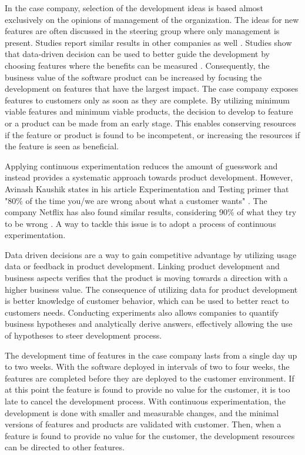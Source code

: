 \documentclass[english]{tktltiki2}
\theoremstyle{definition}
\theoremstyle{remark}
\begin{document}
In the case company, selection of the development ideas is based almost exclusively on the opinions of management of the organization. The ideas for new features are often discussed in the steering group where only management is present. Studies report similar results in other companies as well \cite{kohavi2007practical}. Studies show that data-driven decision can be used to better guide the development by choosing features where the benefits can be measured \cite{kohavi2007practical, moran2007wrong, kaushik}. Consequently, the business value of the software product can be increased by focusing the development on features that have the largest impact. The case company exposes features to customers only as soon as they are complete. By utilizing minimum viable features and minimum viable products, the decision to develop to feature or a product can be made from an early stage. This enables conserving resources if the feature or product is found to be incompetent, or increasing the resources if the feature is seen as beneficial. 

Applying continuous experimentation reduces the amount of guesswork and instead provides a systematic approach towards product development. However, Avinash Kaushik states in his article Experimentation and Testing primer that "80\% of the time you/we are wrong about what a customer wants" \cite{kaushik}. The company Netflix has also found similar results, considering 90\% of what they try to be wrong \cite{moran2007wrong}. A way to tackle this issue is to adopt a process of continuous experimentation.

Data driven decisions are a way to gain competitive advantage by utilizing usage data or feedback in product development. Linking product development and business aspects verifies that the product is moving towards a direction with a higher business value. The consequence of utilizing data for product development is better knowledge of customer behavior, which can be used to better react to customers needs. Conducting experiments also allows companies to quantify business hypotheses and analytically derive answers, effectively allowing the use of hypotheses to steer development process.

The development time of features in the case company lasts from a single day up to two weeks. With the software deployed in intervals of two to four weeks, the features are completed before they are deployed to the customer environment. If at this point the feature is found to provide no value for the customer, it is too late to cancel the development process. With continuous experimentation, the development is done with smaller and measurable changes, and the minimal versions of features and products are validated with customer. Then, when a feature is found to provide no value for the customer, the development resources can be directed to other features.
\end{document}
